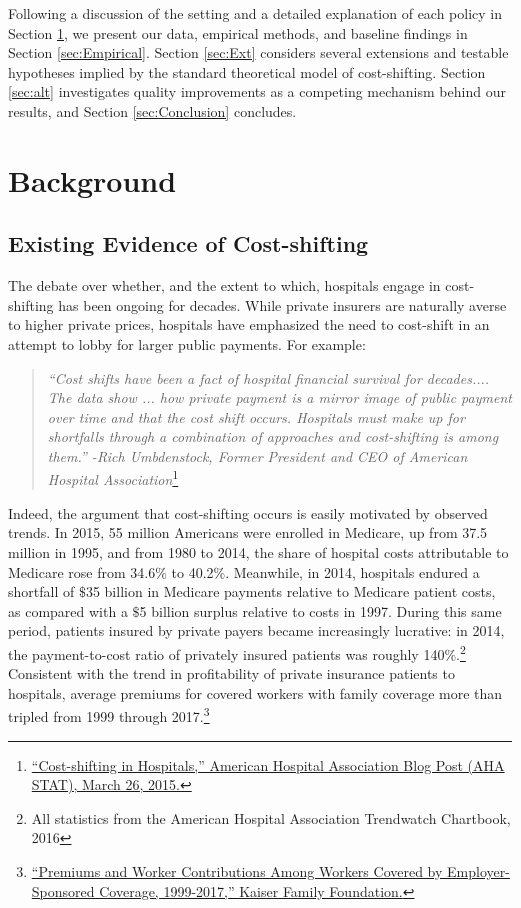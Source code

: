 \documentclass[12pt]{article}
\begin{document}
Following a discussion of the setting and a detailed explanation of each policy in Section \ref{sec:Background}, we present our data, empirical methods, and baseline findings in Section \ref{sec:Empirical}. Section \ref{sec:Ext} considers several extensions and testable hypotheses implied by the standard theoretical model of cost-shifting.  Section \ref{sec:alt} investigates quality improvements as a competing mechanism behind our results, and Section \ref{sec:Conclusion} concludes.

\section{Background}
\label{sec:Background}

\subsection{Existing Evidence of Cost-shifting}
The debate over whether, and the extent to which, hospitals engage in cost-shifting has been ongoing for decades. While private insurers are naturally averse to higher private prices, hospitals have emphasized the need to cost-shift in an attempt to lobby for larger public payments. For example:
\begin{quote}
\textit{``Cost shifts have been a fact of hospital financial survival for decades.... The data show ...  how private payment is a mirror image of public payment over time and that the cost shift occurs. Hospitals must make up for shortfalls through a combination of approaches and cost-shifting is among them.'' -Rich Umbdenstock, Former President and CEO of American Hospital Association}\footnote{\href{http://blog.aha.org/post/costshifting-in-hospitals-}{``Cost-shifting in Hospitals,'' American Hospital Association Blog Post (AHA STAT), March 26, 2015.}}
\end{quote}

Indeed, the argument that cost-shifting occurs is easily motivated by observed trends.  In 2015, 55 million Americans were enrolled in Medicare, up from 37.5 million in 1995, and from 1980 to 2014, the share of hospital costs attributable to Medicare rose from 34.6$\%$ to 40.2$\%$.  Meanwhile, in 2014, hospitals endured a shortfall of $\$$35 billion in Medicare payments relative to Medicare patient costs, as compared with a $\$$5 billion surplus relative to costs in 1997.  During this same period, patients insured by private payers became increasingly lucrative: in 2014, the payment-to-cost ratio of privately insured patients was roughly 140$\%$.\footnote{All statistics from the American Hospital Association Trendwatch Chartbook, 2016} Consistent with the trend in profitability of private insurance patients to hospitals, average premiums for covered workers with family coverage more than tripled from 1999 through 2017.\footnote{\href{https://www.kff.org/interactive/premiums-and-worker-contributions/?coverageGroup=family}{``Premiums and Worker Contributions Among Workers Covered by Employer-Sponsored Coverage, 1999-2017,'' Kaiser Family Foundation.}}
\end{document}
